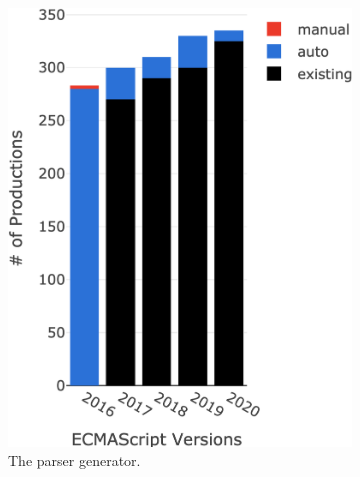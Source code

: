 \begin{figure}[t]
  \centering
  \begin{subfigure}{0.23\textwidth}
    \includegraphics[width=\textwidth]{img/all-version-syntax.png}
    \caption{The parser generator.}
    \label{fig:syntax-all-version}
  \end{subfigure}
  \hfill
  \begin{subfigure}{0.23\textwidth}

\end{subfigure}
\end{figure}
